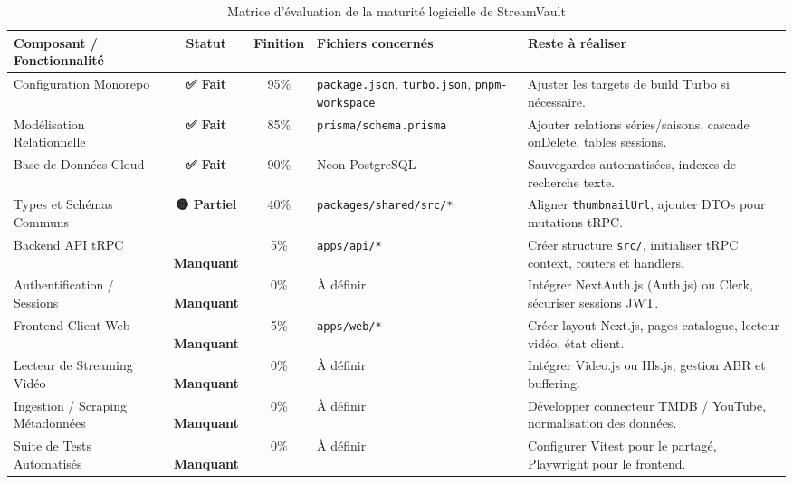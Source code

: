 \documentclass[11pt,a4paper]{article}
\begin{document}
\begin{table}[htbp]
\centering
\small
\renewcommand{\arraystretch}{1.25}
\begin{tabularx}{\textwidth}{p{3.5cm} c c p{3.2cm} X}
\toprule
\textbf{Composant / Fonctionnalité} & \textbf{Statut} & \textbf{Finition} & \textbf{Fichiers concernés} & \textbf{Reste à réaliser} \\
\midrule
Configuration Monorepo & \textcolor{accentGreen}{\textbf{✅ Fait}} & 95\% & \texttt{package.json}, \texttt{turbo.json}, \texttt{pnpm-workspace} & Ajuster les targets de build Turbo si nécessaire. \\
\midrule
Modélisation Relationnelle & \textcolor{accentGreen}{\textbf{✅ Fait}} & 85\% & \texttt{prisma/schema.prisma} & Ajouter relations séries/saisons, cascade onDelete, tables sessions. \\
\midrule
Base de Données Cloud & \textcolor{accentGreen}{\textbf{✅ Fait}} & 90\% & Neon PostgreSQL & Sauvegardes automatisées, indexes de recherche texte. \\
\midrule
Types et Schémas Communs & \textcolor{accentOrange}{\textbf{🟡 Partiel}} & 40\% & \texttt{packages/shared/src/*} & Aligner \texttt{thumbnailUrl}, ajouter DTOs pour mutations tRPC. \\
\midrule
Backend API tRPC & \textcolor{accentRed}{\textbf{🔴 Manquant}} & 5\% & \texttt{apps/api/*} & Créer structure \texttt{src/}, initialiser tRPC context, routers et handlers. \\
\midrule
Authentification / Sessions & \textcolor{accentRed}{\textbf{🔴 Manquant}} & 0\% & \`A définir & Intégrer NextAuth.js (Auth.js) ou Clerk, sécuriser sessions JWT. \\
\midrule
Frontend Client Web & \textcolor{accentRed}{\textbf{🔴 Manquant}} & 5\% & \texttt{apps/web/*} & Créer layout Next.js, pages catalogue, lecteur vidéo, état client. \\
\midrule
Lecteur de Streaming Vidéo & \textcolor{accentRed}{\textbf{🔴 Manquant}} & 0\% & \`A définir & Intégrer Video.js ou Hls.js, gestion ABR et buffering. \\
\midrule
Ingestion / Scraping Métadonnées & \textcolor{accentRed}{\textbf{🔴 Manquant}} & 0\% & \`A définir & Développer connecteur TMDB / YouTube, normalisation des données. \\
\midrule
Suite de Tests Automatisés & \textcolor{accentRed}{\textbf{🔴 Manquant}} & 0\% & \`A définir & Configurer Vitest pour le partagé, Playwright pour le frontend. \\
\bottomrule
\end{tabularx}
\caption{Matrice d'évaluation de la maturité logicielle de StreamVault}
\end{table}
\end{document}
